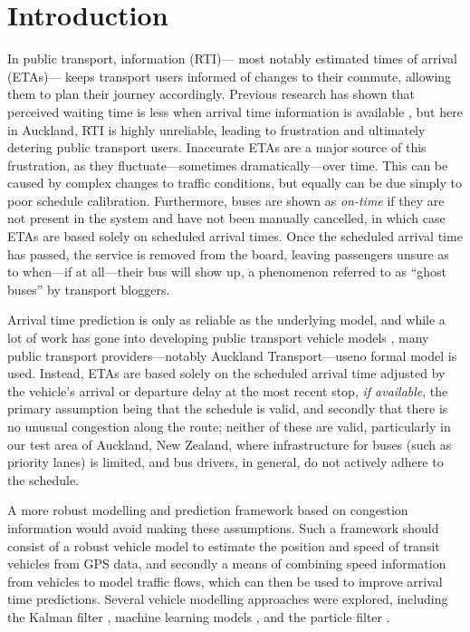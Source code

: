 \section{Introduction}
\label{sec:intro}


In public transport, \rt information (RTI)---%
most notably estimated times of arrival (ETAs)---%
keeps transport users informed of changes to their commute,
allowing them to plan their journey accordingly.
Previous research has shown that perceived waiting time is less
when arrival time information is available \citep{TCRP_2003b},
but here in Auckland, RTI is highly unreliable,
leading to frustration and ultimately detering public transport users.
Inaccurate ETAs are a major source of this frustration,
as they fluctuate---sometimes dramatically---over time.
This can be caused by complex changes to traffic conditions,
but equally can be due simply to poor schedule calibration.
Furthermore, buses are shown as \emph{on-time} 
if they are not present in the \rt system and have not been manually cancelled,
in which case ETAs are based solely on scheduled arrival times.
Once the scheduled arrival time has passed,
the service is removed from the \rt board,
leaving passengers unsure as to when---if at all---their bus will show up,
a phenomenon referred to as ``ghost buses'' by transport bloggers.


Arrival time prediction is only as reliable as the underlying model,
and while a lot of work has gone into developing public transport vehicle models
\citep{Cathey_2003,Jeong_2005,Yu_2011,Hans_2015},
many public transport providers---notably Auckland Transport---useno formal model is used.
Instead, ETAs are based solely on the scheduled arrival time
adjusted by the vehicle's arrival or departure delay at the most recent stop, 
\emph{if available},
the primary assumption being that the schedule is valid,
and secondly that there is no unusual congestion along the route;
neither of these are valid,
particularly in our test area of Auckland, New Zealand,
where infrastructure for buses (such as priority lanes) is limited,
and bus drivers, in general, 
do not actively adhere to the schedule.


A more robust modelling and prediction framework 
based on \rt congestion information would avoid making these assumptions.
Such a framework should consist of a robust vehicle model to estimate the position and speed
of transit vehicles from \rt GPS data,
and secondly a means of combining speed information from vehicles
to model traffic flows,
which can then be used to improve arrival time predictions.
Several vehicle modelling approaches were explored, 
including the Kalman filter \citep{Dailey_2001,Cathey_2003},
machine learning models \citep{Yu_2006,Chang_2010},
and the particle filter \citep{Hans_2015}.


